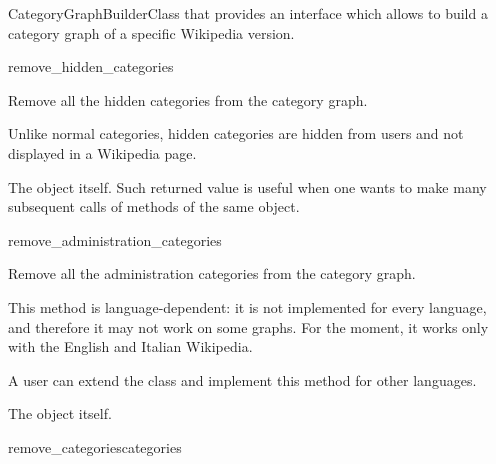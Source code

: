 \begin{classdoc}{CategoryGraphBuilder}{Class that provides an interface which allows to build a category graph of a specific Wikipedia version.}
\begin{classmethod}{remove\_hidden\_categories}{}
                    \begin{functiondescription}
                        Remove all the hidden categories from the category graph.
                        
                        Unlike normal categories, hidden categories are hidden from users and not displayed in a Wikipedia page.
                    \end{functiondescription}
                    
                    \emptyfunctionparameters{}
                    
                    \begin{functionoutput}
                        The  object itself. Such returned value is useful when one wants to make many subsequent calls of methods of the same object.
                    \end{functionoutput}
                \end{classmethod}
                \item \begin{classmethod}{remove\_administration\_categories}{}
                
                    \begin{functiondescription}
                        Remove all the administration categories from the category graph.
                        
                        This method is language-dependent: it is not implemented for every language, and therefore it may not work on some graphs. For the moment, it works only with the English and Italian Wikipedia.
                        
                        A user can extend the  class and implement this method for other languages.
                    \end{functiondescription}
                    
                    \emptyfunctionparameters{}
                    
                    \begin{functionoutput}
                        The  object itself.
                    \end{functionoutput}
                \end{classmethod}
                \item \begin{classmethod}{remove\_categories}{categories}
                

\end{classmethod}
\end{classdoc}

